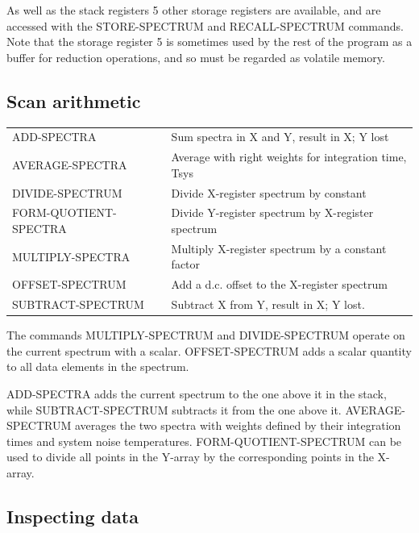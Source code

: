 \documentclass[11pt,twoside]{report}
\begin{document}
As well as the stack registers 5 other storage registers are available, and are accessed with the STORE-SPECTRUM and
RECALL-SPECTRUM commands. Note that the storage register 5 is sometimes used by
the rest of the program as a buffer for reduction operations, and so must be
regarded as volatile memory. 

\subsection{Scan arithmetic}

\begin{tabular}{ll}
ADD-SPECTRA              & Sum spectra in X and Y, result in X; Y lost\\
AVERAGE-SPECTRA          & Average with right weights for integration time, Tsys\\
DIVIDE-SPECTRUM          & Divide X-register spectrum by constant\\
FORM-QUOTIENT-SPECTRA    & Divide Y-register spectrum by X-register spectrum\\
MULTIPLY-SPECTRA         & Multiply X-register spectrum by a constant factor\\
OFFSET-SPECTRUM          & Add a d.c. offset to the X-register spectrum\\
SUBTRACT-SPECTRUM         & Subtract X from Y, result in X; Y lost.\\
\end{tabular}


The commands MULTIPLY-SPECTRUM and DIVIDE-SPECTRUM operate on the current
spectrum with a scalar. OFFSET-SPECTRUM adds a scalar quantity to all
data elements in the spectrum.

ADD-SPECTRA adds the current spectrum to the one above it in the stack, 
while SUBTRACT-SPECTRUM subtracts it from the one above it. AVERAGE-SPECTRUM
averages the two spectra with weights defined by their integration times
and system noise temperatures. FORM-QUOTIENT-SPECTRUM can be used to
divide all points in the Y-array by the corresponding points in the X-array.

\subsection{Inspecting data}
\end{document}
